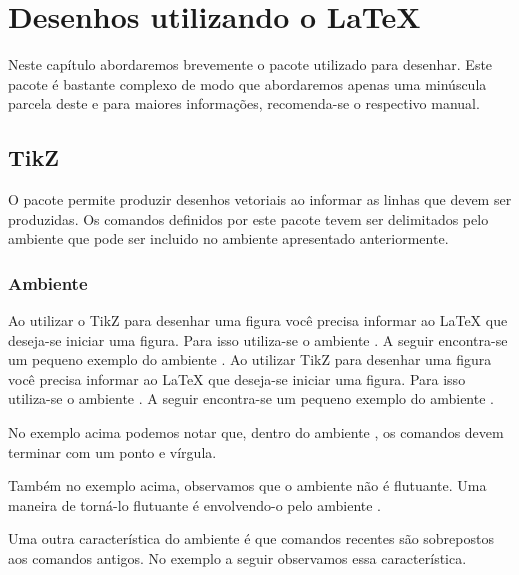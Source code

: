\chapter{Desenhos utilizando o \LaTeX}
Neste capítulo abordaremos brevemente o pacote
\nocite{Tantau:2010:Tikz-and-PGF} utilizado para desenhar.
Este pacote é bastante complexo de modo que abordaremos apenas
uma minúscula parcela deste e para maiores informações, recomenda-se o
respectivo manual.

\section{TikZ} \label{sse:tikz}
O pacote  permite produzir desenhos vetoriais ao informar as linhas que devem ser produzidas. Os comandos definidos por este pacote tevem ser delimitados pelo ambiente  que pode ser incluido no ambiente  apresentado anteriormente.

\subsection{Ambiente }
Ao utilizar o TikZ para desenhar uma figura você precisa informar ao LaTeX que deseja-se iniciar uma figura. Para isso utiliza-se o ambiente . A seguir encontra-se um pequeno exemplo do ambiente . 
Ao utilizar TikZ para desenhar uma figura você precisa informar ao LaTeX que deseja-se iniciar uma figura. Para isso utiliza-se o ambiente . A seguir encontra-se um pequeno exemplo do ambiente . \\

No exemplo acima podemos notar que, dentro do ambiente , os comandos devem terminar com um ponto e vírgula.

Também no exemplo acima, observamos que o ambiente  não é flutuante. Uma maneira de torná-lo flutuante é envolvendo-o pelo ambiente .

Uma outra característica do ambiente  é que comandos recentes são sobrepostos aos comandos antigos. No exemplo a seguir observamos essa característica. \\

